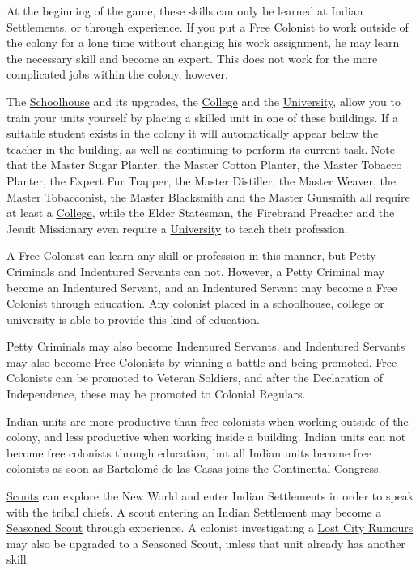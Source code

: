 \documentclass[12pt]{article}
\begin{document}
At the beginning of the game, these skills can only be learned at
Indian Settlements, or through experience. If you put a Free Colonist
to work outside of the colony for a long time without changing his
work assignment, he may learn the necessary skill and become an
expert. This does not work for the more complicated jobs within the
colony, however. 

The \hyperlink{Schoolhouse}{Schoolhouse} and its upgrades, the
\hyperlink{College}{College} and the
\hyperlink{University}{University}, allow you to train your units
yourself by placing a skilled unit in one of these buildings.  If a
suitable student exists in the colony it will automatically appear
below the teacher in the building, as well as continuing to perform
its current task.  Note that the Master Sugar Planter, the Master
Cotton Planter, the Master Tobacco Planter, the Expert Fur Trapper,
the Master Distiller, the Master Weaver, the Master Tobacconist, the
Master Blacksmith and the Master Gunsmith all require at least a
\hyperlink{College}{College}, while the Elder Statesman, the Firebrand
Preacher and the Jesuit Missionary even require a
\hyperlink{University}{University} to teach their profession.

A Free Colonist can learn any skill or profession in this manner, but
Petty Criminals and Indentured Servants can not.  However, a Petty
Criminal may become an Indentured Servant, and an Indentured Servant
may become a Free Colonist through education. Any colonist placed in a
schoolhouse, college or university is able to provide this kind of
education.

Petty Criminals may also become Indentured Servants, and Indentured
Servants may also become Free Colonists by winning a battle and being
\hyperlink{promotion}{promoted}. Free Colonists can be promoted to
Veteran Soldiers, and after the Declaration of Independence, these may
be promoted to Colonial Regulars.

Indian units are more productive than free colonists when working
outside of the colony, and less productive when working inside a
building. Indian units can not become free colonists through
education, but all Indian units become free colonists as soon as
\hyperlink{Bartolome de las Casas}{Bartolom\'e de las Casas} joins
the \hyperlink{Continental Congress}{Continental Congress}.

\hyperlink{Scout}{Scouts} can explore the New World and enter Indian
Settlements in order to speak with the tribal chiefs. A scout entering
an Indian Settlement may become a \hyperlink{Seasoned Scout}{Seasoned
Scout} through experience. A colonist investigating a \hyperlink{Lost
City Rumours}{Lost City Rumours} may also be upgraded to a Seasoned
Scout, unless that unit already has another skill.
\end{document}
